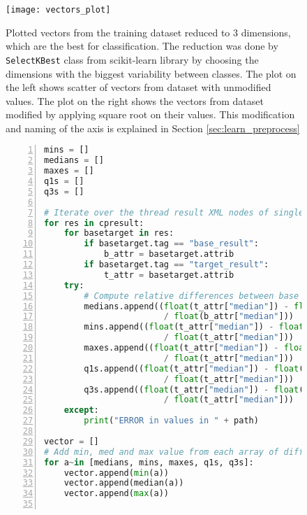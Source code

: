 \begin{figure}
  \centering
  \texttt{[image: vectors\_plot]}
  \caption{Plotted vectors from the training dataset reduced
    to 3 dimensions, which are the best for classification. The reduction was done by
    \texttt{SelectKBest} class from scikit-learn library by choosing the
    dimensions with the biggest variability between classes. The plot on the
    left shows scatter of vectors from dataset with unmodified values. The plot
    on the right shows the vectors from dataset modified by applying square root
    on their values. This modification and naming of the axis is explained in
    Section \ref{sec:learn_preprocess}}
  \label{fig:vectors_plot}
\end{figure}

\begin{figure}
  \small
  \begin{lstlisting}[language=Python, numbers=left]
mins = []
medians = []
maxes = []
q1s = []
q3s = []

# Iterate over the thread result XML nodes of single benchmark operation
for res in cpresult:
    for basetarget in res:
        if basetarget.tag == "base_result":
            b_attr = basetarget.attrib
        if basetarget.tag == "target_result":
            t_attr = basetarget.attrib
    try:
        # Compute relative differences between base and target results
        medians.append((float(t_attr["median"]) - float(b_attr["median"]))
                        / float(b_attr["median"]))
        mins.append((float(t_attr["median"]) - float(t_attr["min"]))
                        / float(t_attr["median"]))
        maxes.append((float(t_attr["median"]) - float(t_attr["max"]))
                        / float(t_attr["median"]))
        q1s.append((float(t_attr["median"]) - float(t_attr["first_q"]))
                        / float(t_attr["median"]))
        q3s.append((float(t_attr["median"]) - float(t_attr["third_q"]))
                        / float(t_attr["median"]))
    except:
        print("ERROR in values in " + path)

vector = []
# Add min, med and max value from each array of differences
for a~in [medians, mins, maxes, q1s, q3s]:
    vector.append(min(a))
    vector.append(median(a))
    vector.append(max(a))


\end{lstlisting}
\end{figure}
